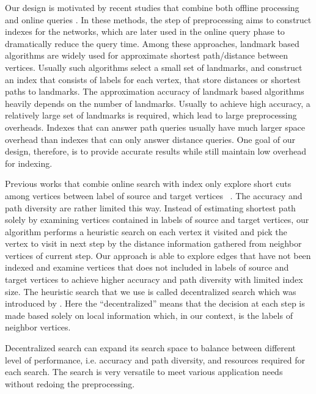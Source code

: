Our design is motivated by recent studies that combine both offline processing and online queries \cite{Potamias:2009:FSP:1645953.1646063, tretyakov2011fast, Akiba:2012:SQC:2247596.2247614, 6399472, Jin:2012:HLA:2213836.2213887}. In these methods, the step of preprocessing aims to construct indexes for the networks, which are later used in the online query phase to dramatically reduce the query time. Among these approaches, landmark based algorithms \cite{Thorup:2005:ADO:1044731.1044732, Goldberg:2005:CSP:1070432.1070455, Potamias:2009:FSP:1645953.1646063, Gubichev:2010:FAE:1871437.1871503, tretyakov2011fast, 6399472}are widely used for approximate shortest path/distance between vertices. Usually such algorithms select a small set of landmarks, and construct an index that consists of labels for each vertex, that store distances or shortest paths to landmarks. The approximation accuracy of landmark based algorithms heavily depends on the number of landmarks. Usually to achieve high accuracy, a relatively large set of landmarks is required, which lead to large preprocessing overheads. Indexes that can answer path queries usually have much larger space overhead than indexes that can only answer distance queries. One goal of our design, therefore, is to provide accurate results while still maintain low overhead for indexing.

Previous works that combie online search with index only explore short cuts among vertices between label of source and target vertices ~\cite{Gubichev:2010:FAE:1871437.1871503, 6399472}. The accuracy and path diversity are rather limited this way. Instead of estimating shortest path solely by examining vertices contained in labels of source and target vertices, our algorithm performs a heuristic search on each vertex it visited and pick the vertex to visit in next step by the distance information gathered from neighbor vertices of current step. Our approach is able to explore edges that have not been indexed and examine vertices that does not included in labels of source and target vertices to achieve higher accuracy and path diversity with limited index size. The heuristic search that we use is called decentralized search which was introduced by \cite{Kleinberg:2000p5066}. Here the "`decentralized"' means that the decision at each step is made based solely on local information which, in our context, is the labels of neighbor vertices.

Decentralized search can expand its search space to balance between different level of performance, i.e. accuracy and path diversity, and resources required for each search. The search is very versatile to meet various application needs without redoing the preprocessing.  

